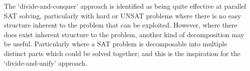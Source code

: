 \documentclass[
10pt, %
a4paper, %
oneside, %
headinclude,footinclude, %
BCOR5mm, %
]{scrartcl}
\begin{document}

The `divide-and-conquer' approach is identified as being quite effective at parallel SAT solving, particularly with hard or UNSAT problems where there is no easy structure inherent to the problem that can be exploited.
However, where there does exist inherent structure to the problem, another kind of decomposition may be useful.
Particularly where a SAT problem is decomposable into multiple distinct parts which could be solved together; and this is the inspiration for the `divide-and-unify' approach.
\end{document}
